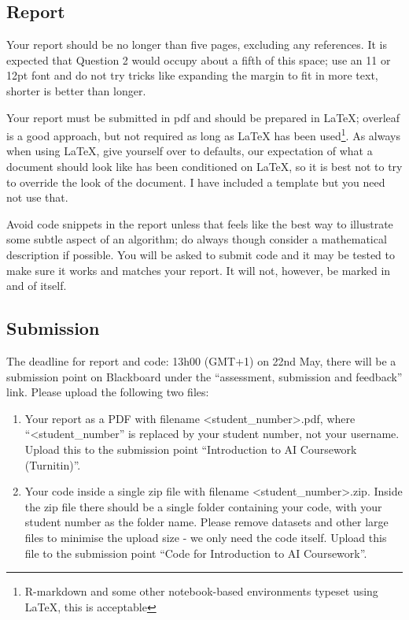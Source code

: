 \documentclass[12pt]{article}
\begin{document}
\subsection*{Report}

Your report should be no longer than five pages, excluding any
references. It is expected that Question 2 would occupy about a fifth
of this space; use an 11 or 12pt font and do not try tricks like
expanding the margin to fit in more text, shorter is better than
longer.

Your report must be submitted in pdf and should be prepared in LaTeX;
overleaf is a good approach, but not required as long as LaTeX has
been used\footnote{R-markdown and some other notebook-based environments typeset using LaTeX, this is acceptable}. As always when using LaTeX, give yourself over to defaults,
our expectation of what a document should look like has been
conditioned on LaTeX, so it is best not to try to override the look of
the document. I have included a template but you need not use that.

Avoid code snippets in the report unless that feels like the best way
to illustrate some subtle aspect of an algorithm; do always though
consider a mathematical description if possible. You will be asked to
submit code and it may be tested to make sure it works and matches
your report. It will not, however, be marked in and of itself.


\subsection*{Submission}

The deadline for report and code: 13h00 (GMT+1) on 22nd May, there
will be a submission point on Blackboard under the ``assessment,
submission and feedback'' link. Please upload the following two files:
\begin{enumerate}
\item Your report as a PDF with filename <student\_number>.pdf, where ``<student\_number'' is replaced by your student number, not your username. Upload this to the submission point ``Introduction to AI Coursework (Turnitin)''.
\item Your code inside a single zip file with filename
  <student\_number>.zip. Inside the zip file there should be a single
  folder containing your code, with your student number as the folder
  name. Please remove datasets and other large files to minimise the
  upload size - we only need the code itself. Upload this file to the
  submission point ``Code for Introduction to AI Coursework''.
\end{enumerate}
  
\end{document}
